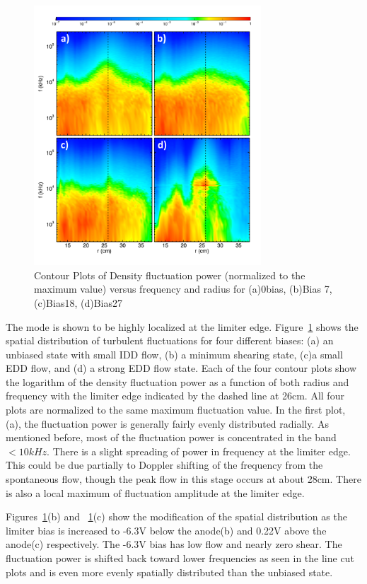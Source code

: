 \documentclass[aip,pop,amsmath,amssymb,reprint,superscriptaddress]{revtex4-1} %
\begin{document}
\begin{figure}[!htbp]
\centerline{
\includegraphics[width=8.5cm]{dens_spec_contours_4bias_lab}}%
\caption{\label{fig:dens_spec_contours_4bias} Contour Plots of Density fluctuation power (normalized to the maximum value) versus frequency and radius for (a)0bias, (b)Bias 7, (c)Bias18, (d)Bias27}
\end{figure}

The mode is shown to be highly localized at the limiter edge. Figure~\ref{fig:dens_spec_contours_4bias} shows the spatial distribution of turbulent fluctuations for four different biases: (a) an unbiased state with small IDD flow, (b) a minimum shearing state, (c)a small EDD flow, and (d) a strong EDD flow state. Each of the four contour plots show the logarithm of the density fluctuation power as a function of both radius and frequency with the limiter edge indicated by the dashed line at 26cm. All four plots are normalized to the same maximum fluctuation value. In the first plot, (a), the fluctuation power is generally fairly evenly distributed radially. As mentioned before, most of the fluctuation power is concentrated in the band $<10kHz$. There is a slight spreading of power in frequency at the limiter edge. This could be due partially to Doppler shifting of the frequency from the spontaneous flow, though the peak flow in this stage occurs at about 28cm. There is also a local maximum of fluctuation amplitude at the limiter edge. 

Figures~\ref{fig:dens_spec_contours_4bias}(b) and ~\ref{fig:dens_spec_contours_4bias}(c) show the modification of the spatial distribution as the limiter bias is increased to -6.3V below the anode(b) and 0.22V above the anode(c) respectively. The -6.3V bias has low flow and nearly zero shear. The fluctuation power is shifted back toward lower frequencies as seen in the line cut plots and is even more evenly spatially distributed than the unbiased state. 
\end{document}
